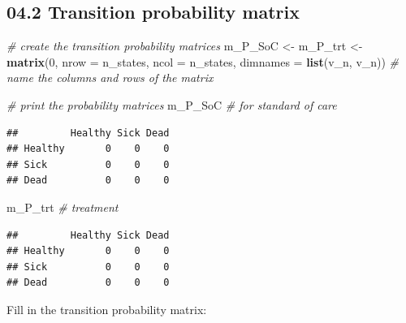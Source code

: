 \documentclass[
]{article}
\newenvironment{Shaded}{\begin{snugshade}}{\end{snugshade}}
\newcommand{\CommentTok}[1]{\textcolor[rgb]{0.56,0.35,0.01}{\textit{#1}}}
\newcommand{\DataTypeTok}[1]{\textcolor[rgb]{0.13,0.29,0.53}{#1}}
\newcommand{\DecValTok}[1]{\textcolor[rgb]{0.00,0.00,0.81}{#1}}
\newcommand{\KeywordTok}[1]{\textcolor[rgb]{0.13,0.29,0.53}{\textbf{#1}}}
\newcommand{\NormalTok}[1]{#1}
\newcommand{\StringTok}[1]{\textcolor[rgb]{0.31,0.60,0.02}{#1}}
\begin{document}
\hypertarget{transition-probability-matrix}{%
\subsection{04.2 Transition probability
matrix}\label{transition-probability-matrix}}

\begin{Shaded}
\begin{Highlighting}[]
\CommentTok{# create the transition probability matrices}
\NormalTok{m_P_SoC  <-}\StringTok{ }\NormalTok{m_P_trt <-}\StringTok{ }\KeywordTok{matrix}\NormalTok{(}\DecValTok{0}\NormalTok{,}
                              \DataTypeTok{nrow =}\NormalTok{ n_states, }\DataTypeTok{ncol =}\NormalTok{ n_states,}
                              \DataTypeTok{dimnames =} \KeywordTok{list}\NormalTok{(v_n, v_n))  }\CommentTok{# name the columns and rows of the matrix }
                                               
\CommentTok{# print the probability matrices }
\NormalTok{m_P_SoC  }\CommentTok{# for standard of care}
\end{Highlighting}
\end{Shaded}

\begin{verbatim}
##         Healthy Sick Dead
## Healthy       0    0    0
## Sick          0    0    0
## Dead          0    0    0
\end{verbatim}

\begin{Shaded}
\begin{Highlighting}[]
\NormalTok{m_P_trt  }\CommentTok{# treatment}
\end{Highlighting}
\end{Shaded}

\begin{verbatim}
##         Healthy Sick Dead
## Healthy       0    0    0
## Sick          0    0    0
## Dead          0    0    0
\end{verbatim}

Fill in the transition probability matrix:
\end{document}
